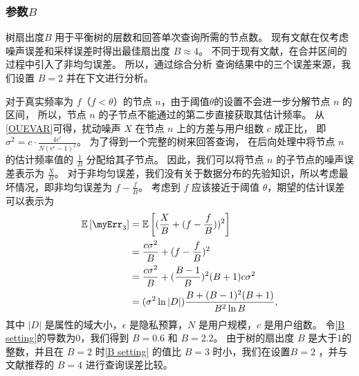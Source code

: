 \subsubsection{参数$B$}
树扇出度$B$ 用于平衡树的层数和回答单次查询所需的节点数。
现有文献{\rm\cite{wang2019answering, cormode2019answering}}在仅考虑噪声误差和采样误差时得出最佳扇出度 $B \approx 4$。
不同于现有文献，\myahead 在合并区间的过程中引入了非均匀误差。
所以，通过综合分析 \myahead 查询结果中的三个误差来源，我们设置 $B=2$ 并在下文进行分析。

对于真实频率为 $f$（$f<\theta$）的节点 $n$，\myahead 由于阈值$\theta$的设置不会进一步分解节点 $n$ 的区间，
所以，节点 $n$ 的子节点不能通过\myahead 的第二步直接获取其估计频率。
从\autoref{OUEVAR}可得，扰动噪声 $X$ 在节点 $n$ 上的方差与用户组数 $c$ 成正比，
即 $\sigma^2 = c \cdot \frac{4e^{\epsilon}}{N\left(e^{\epsilon}-1\right)^{2}}$。
为了得到一个完整的树来回答查询，
\myahead 在后向处理中将节点 $n$ 的估计频率值的 $\frac{1}{B}$ 分配给其子节点。
因此，我们可以将节点 $n$ 的子节点的噪声误差表示为 $\frac{X}{B}$。
对于非均匀误差，我们没有关于数据分布的先验知识，所以考虑最坏情况，即非均匀误差为 $f-\frac{f}{B}$。
考虑到 $f$ 应该接近于阈值 $\theta$，期望的估计误差可以表示为
\begin{align}
    \mathbb{E}\left[\myErr_3\right] &= \mathbb{E}\left[(\frac{X}{B}+(f-\frac{f}{B}))^2\right] \nonumber \\
    &=\frac{c \sigma ^2}{B} + (f-\frac{f}{B})^2 \nonumber \\ 
    &=\frac{c \sigma ^2}{B} + (\frac{B-1}{B})^2 (B+1) c \sigma^2 \nonumber \\ 
    &=(\sigma^2\ln{|D|})\frac{B+(B-1)^2(B+1)}{B^2\ln{B}},
    \label{B setting}
\end{align}  
其中 $|D|$ 是属性的域大小，$\epsilon$ 是隐私预算，$N$ 是用户规模，$c$ 是用户组数。
令\autoref{B setting}的导数为0，我们得到 $B=0.6$ 和 $B=2.2$。
由于树的扇出度 $B$ 是大于1的整数，并且在 $B=2$ 时\autoref{B setting} 的值比 $B=3$ 时小，我们在\myahead 设置$B=2$ ，并与文献{\rm\parencite{wang2019answering, cormode2019answering}}推荐的 $B=4$ 进行查询误差比较。



